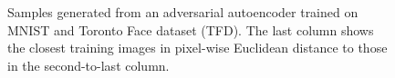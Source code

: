 \documentclass{article}
\begin{document}
\begin{figure}[b]
\centering
{}
\hspace{.2cm}
\caption{\label{fig_samples}Samples generated from an adversarial autoencoder trained on MNIST and Toronto Face dataset (TFD). The last column shows the closest training images in pixel-wise Euclidean distance to those in the second-to-last column.}
\end{figure}
\end{document}
